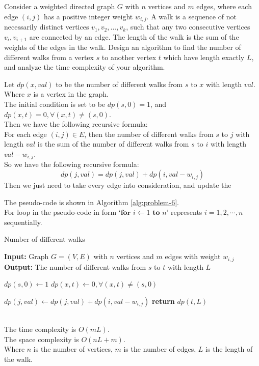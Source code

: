 \problem{}
Consider a weighted directed graph $G$ with $n$ vertices and $m$ edges, where each edge $(i,j)$ has a positive integer weight $w_{i, j}$. A  walk is a sequence of not necessarily distinct vertices $v_1, v_2, ..., v_k$, such that any two consecutive vertices $v_i, v_{i+1}$ are connected by an edge. The length of the walk is the sum of the weights of the edges in the walk.  Design an algorithm to find the number of different walks from a vertex $s$ to another vertex $t$ which have length exactly $L$, and analyze the time complexity of your algorithm. 

\solution{}

Let $dp(x, val)$ to be the number of different walks from $s$ to $x$ with length $val$.\\
Where $x$ is a vertex in the graph.\\
The initial condition is set to be $dp(s,0)=1$, and $dp(x,t)=0, \forall (x,t)\neq (s,0)$.\\
Then we have the following recursive formula:\\
For each edge $(i,j)\in E$, then the number of different walks from $s$ to $j$ with length $val$ is the sum of the number of different walks from $s$ to $i$ with length $val-w_{i,j}$.\\
So we have the following recursive formula:
$$dp(j,val) = dp(j,val)+dp(i, val-w_{i,j})$$
Then we just need to take every edge into consideration, and update the 


The pseudo-code is shown in Algorithm \ref{alg:problem-6}.\\
For loop in the pseudo-code in form `$\textbf{for } i \gets 1 \textbf{ to } n$' represents $i=1,2,\cdots,n$ sequentially.
\begin{algorithm}
    \caption{Number of different walks}
    \begin{algorithmic}[1]
    \State \textbf{Input:} Graph $G=(V,E)$ with $n$ vertices and $m$ edges with weight $w_{i,j}$
    \State \textbf{Output:} The number of different walks from $s$ to $t$ with length $L$
    
    \State $dp(s,0) \gets 1$
    \State $dp(x,t) \gets 0, \forall (x,t)\neq (s,0)$
    
            \State $dp(j,val) \gets dp(j,val)+dp(i, val-w_{i,j})$
        \EndFor
    \EndFor
    \State \textbf{return} $dp(t,L)$
    \end{algorithmic}
    \label{alg:problem-6}
\end{algorithm}\\
The time complexity is $O(mL)$.\\
The space complexity is $O(nL+m)$.\\
Where $n$ is the number of vertices, $m$ is the number of edges, $L$ is the length of the walk.\\